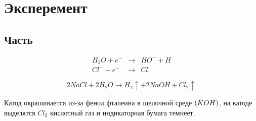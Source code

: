 \section{Эксперемент}
\subsection{Часть}
\begin{eqnarray}
    H_2O + e^- &\to&  HO^- + H \\
    Cl^- - e^- &\to& Cl  
\end{eqnarray}


\begin{equation}
    2NaCl + 2H_2O \to H_2\uparrow + 2NaOH + Cl_2\uparrow
\end{equation}

Катод окрашивается из-за фенол фталеина в щелочной среде $\left( KOH \right)$, 
на катоде выделятся $Cl_2$ кислотный газ и индикаторная бумага темнеет.


